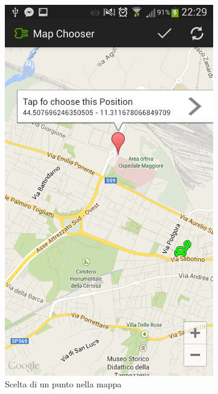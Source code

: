 \begin{figure}
\begin{subfigure}{0.45\textwidth}
		\includegraphics[width=\textwidth]{assets/mobile-app-map-chooser.png}
		\caption{Scelta di un punto nella mappa}
		\label{fig:map-chooser}
	\end{subfigure}
	\begin{subfigure}{0.45\textwidth}

\end{subfigure}
\end{figure}

